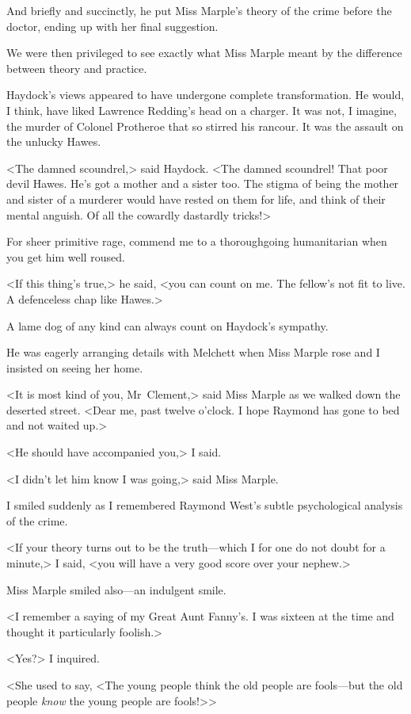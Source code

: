 And briefly and succinctly, he put Miss Marple's theory of the crime before the doctor, ending up with her final suggestion.

We were then privileged to see exactly what Miss Marple meant by the difference between theory and practice.

Haydock's views appeared to have undergone complete transformation. He would, I think, have liked Lawrence Redding's head on a charger. It was not, I imagine, the murder of Colonel Protheroe that so stirred his rancour. It was the assault on the unlucky Hawes.

<The damned scoundrel,> said Haydock. <The damned scoundrel! That poor devil Hawes. He's got a mother and a sister too. The stigma of being the mother and sister of a murderer would have rested on them for life, and think of their mental anguish. Of all the cowardly dastardly tricks!>

For sheer primitive rage, commend me to a thoroughgoing humanitarian when you get him well roused.

<If this thing's true,> he said, <you can count on me. The fellow's not fit to live. A defenceless chap like Hawes.>

A lame dog of any kind can always count on Haydock's sympathy.

He was eagerly arranging details with Melchett when Miss Marple rose and I insisted on seeing her home.

<It is most kind of you, Mr~Clement,> said Miss Marple as we walked down the deserted street. <Dear me, past twelve o'clock. I hope Raymond has gone to bed and not waited up.>

<He should have accompanied you,> I said.

<I didn't let him know I was going,> said Miss Marple.

I smiled suddenly as I remembered Raymond West's subtle psychological analysis of the crime.

<If your theory turns out to be the truth—which I for one do not doubt for a minute,> I said, <you will have a very good score over your nephew.>

Miss Marple smiled also—an indulgent smile.

<I remember a saying of my Great Aunt Fanny's. I was sixteen at the time and thought it particularly foolish.>

<Yes?> I inquired.

<She used to say, <The young people think the old people are fools—but the old people \emph{know} the young people are fools!>>